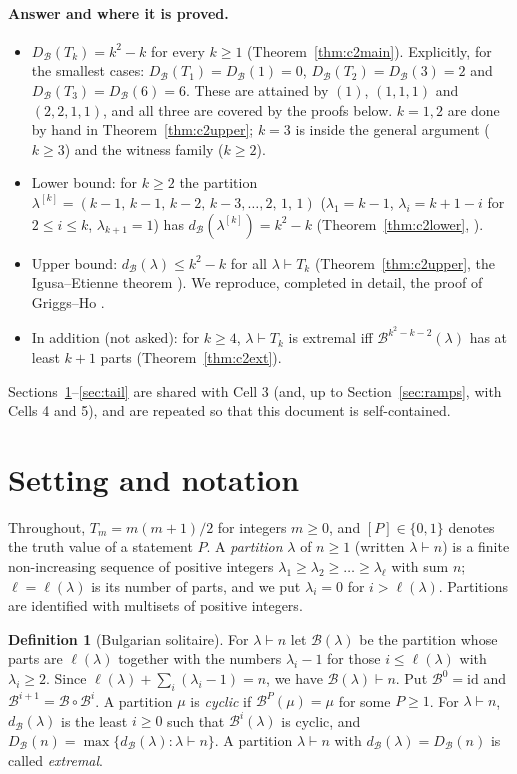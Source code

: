 \documentclass[11pt]{article}
\theoremstyle{definition}
\newtheorem{definition}[theorem]{Definition}
\newcommand{\B}{\mathcal{B}}
\newcommand{\dB}{d_{\mathcal{B}}}
\newcommand{\DB}{D_{\mathcal{B}}}
\renewcommand{\le}{\leqslant}
\renewcommand{\ge}{\geqslant}
\begin{document}
\paragraph{Answer and where it is proved.}
\begin{itemize}
\item $\DB(T_k)=k^2-k$ for every $k\ge1$ (Theorem~\ref{thm:c2main}).  Explicitly, for the smallest cases:
$\DB(T_1)=\DB(1)=0$, $\DB(T_2)=\DB(3)=2$ and $\DB(T_3)=\DB(6)=6$.  These are attained by $(1)$, $(1,1,1)$ and
$(2,2,1,1)$, and all three are covered by the proofs below.  $k=1,2$ are done by hand in
Theorem~\ref{thm:c2upper}; $k=3$ is inside the general argument ($k\ge3$) and the witness family ($k\ge2$).
\item Lower bound: for $k\ge2$ the partition
$\lambda^{[k]}=(k-1,\,k-1,\,k-2,\,k-3,\dots,2,\,1,\,1)$ ($\lambda_1=k-1$, $\lambda_i=k+1-i$ for $2\le i\le k$,
$\lambda_{k+1}=1$) has $\dB(\lambda^{[k]})=k^2-k$ (Theorem~\ref{thm:c2lower}, \cite[Thm.~3.1]{GH}).
\item Upper bound: $\dB(\lambda)\le k^2-k$ for all $\lambda\vdash T_k$ (Theorem~\ref{thm:c2upper}, the Igusa--Etienne
theorem \cite{Ig,Et}).  We reproduce, completed in detail, the proof of Griggs--Ho \cite[Lemmas 3.3--3.6,
Thm.~3.7]{GH}.
\item In addition (not asked): for $k\ge4$, $\lambda\vdash T_k$ is extremal iff $\B^{k^2-k-2}(\lambda)$ has at least $k+1$ parts
(Theorem~\ref{thm:c2ext}).
\end{itemize}
Sections~\ref{sec:defs}--\ref{sec:tail} are shared with Cell 3 (and, up to Section~\ref{sec:ramps}, with Cells 4
and 5), and are repeated so that this document is self-contained.

\section{Setting and notation}\label{sec:defs}

Throughout, $T_m=m(m+1)/2$ for integers $m\ge 0$, and $[P]\in\{0,1\}$ denotes the truth value
of a statement $P$.
A \emph{partition} $\lambda$ of $n\ge 1$ (written $\lambda\vdash n$) is a finite non-increasing
sequence of positive integers $\lambda_1\ge\lambda_2\ge\dots\ge\lambda_\ell$ with sum $n$;
$\ell=\ell(\lambda)$ is its number of parts, and we put $\lambda_i=0$ for $i>\ell(\lambda)$.
Partitions are identified with multisets of positive integers.

\begin{definition}[Bulgarian solitaire]
For $\lambda\vdash n$ let $\B(\lambda)$ be the partition whose parts are $\ell(\lambda)$ together
with the numbers $\lambda_i-1$ for those $i\le\ell(\lambda)$ with $\lambda_i\ge 2$.
Since $\ell(\lambda)+\sum_{i}(\lambda_i-1)=n$, we have $\B(\lambda)\vdash n$.
Put $\B^0=\mathrm{id}$ and $\B^{i+1}=\B\circ\B^{i}$.
A partition $\mu$ is \emph{cyclic} if $\B^P(\mu)=\mu$ for some $P\ge 1$.
For $\lambda\vdash n$, $\dB(\lambda)$ is the least $i\ge 0$ such that $\B^i(\lambda)$ is cyclic,
and $\DB(n)=\max\{\dB(\lambda):\lambda\vdash n\}$.
A partition $\lambda\vdash n$ with $\dB(\lambda)=\DB(n)$ is called \emph{extremal}.
\end{definition}
\end{document}
